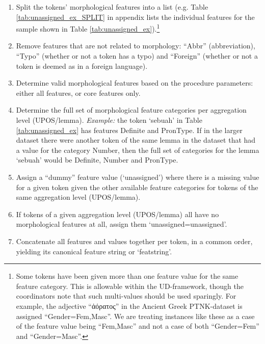 \documentclass[USenglish]{article}
\begin{document}
\begin{enumerate}
\item Split the tokens' morphological features into a list (e.g. Table \ref{tab:unassigned_ex_SPLIT} in appendix lists the individual features for the sample shown in Table \ref{tab:unassigned_ex}).\footnote{Some tokens have been given more than one feature value for the same feature category. This is allowable within the UD-framework, though the coordinators note that such multi-values should be used sparingly. For example, the adjective ``{\dolousfont ἀ}{\cyrillicfont όρατος}'' in the Ancient Greek PTNK-dataset is assigned ``Gender=Fem,Masc''. We are treating instances like these as a case of the feature value being ``Fem,Masc'' and not a case of both ``Gender=Fem'' and ``Gender=Masc''.}
\item Remove features that are not related to morphology: ``Abbr'' (abbreviation), ``Typo'' (whether or not a token has a typo) and ``Foreign'' (whether or not a token is deemed as in a foreign language).
\item Determine valid morphological features based on the procedure parameters: either all features, or core features only.
\item Determine the full set of morphological feature categories per aggregation level (UPOS/lemma). \textit{Example:} the token `sebuah' in Table \ref{tab:unassigned_ex} has features Definite and PronType. If in the larger dataset there were another token of the same lemma in the dataset that had a value for the category Number, then the full set of categories for the lemma `sebuah' would be Definite, Number and PronType.
\item Assign a ``dummy'' feature value (`unassigned') where there is a missing value for a given token given the other available feature categories for tokens of the same aggregation level (UPOS/lemma). %
\item If tokens of a given aggregation level (UPOS/lemma) all have no morphological features at all, assign them `unassigned=unassigned'.
\item Concatenate all features and values together per token, in a common order, yielding its canonical feature string or `featstring'.\\


\end{enumerate}
\end{document}
